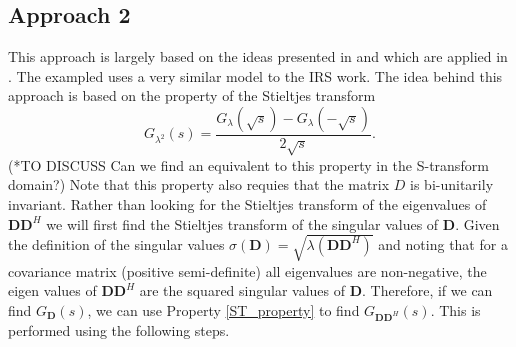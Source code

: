 \documentclass[12pt,a4paper]{article}
\begin{document}
\subsection{Approach 2} 
This approach is largely based on the ideas presented in \cite{muller2012channel} and which are applied in \cite[Eqns. 54-56]{muller2014blind}. The exampled \cite{muller2012channel} uses a very similar model to the IRS work.  The idea behind this approach is based on the property of the Stieltjes transform 
	\begin{equation}\label{ST_property}
	G_{\lambda^2}(s) = \frac{G_{\lambda}(\sqrt{s})- G_{\lambda}(-\sqrt{s})}{2\sqrt{s}}.
	\end{equation} (*TO DISCUSS Can we find an equivalent to this property in the S-transform domain?)
	Note that this property also requies that the matrix $D$ is bi-unitarily invariant.
	Rather than looking for the Stieltjes transform of the eigenvalues of $\mathbf{D} \mathbf{D}^H$ we will
	first find the Stieltjes transform of the singular values of $\mathbf{D}$. 
	Given the definition of the singular values $\sigma(\mathbf{D}) = \sqrt{\lambda(\mathbf{D} \mathbf{D}^H)}$ and 
	noting that 
	for a covariance matrix (positive semi-definite) all eigenvalues are non-negative, the eigen
	values of $\mathbf{D} \mathbf{D}^H$ are the squared singular values of  $\mathbf{D}$. Therefore, if 
	we can find $G_{\mathbf{D}}(s)$, we can use Property \ref{ST_property} to find $G_{\mathbf{D} \mathbf{D}^H}(s)$.
	 This is performed using the following steps. 
\end{document}
